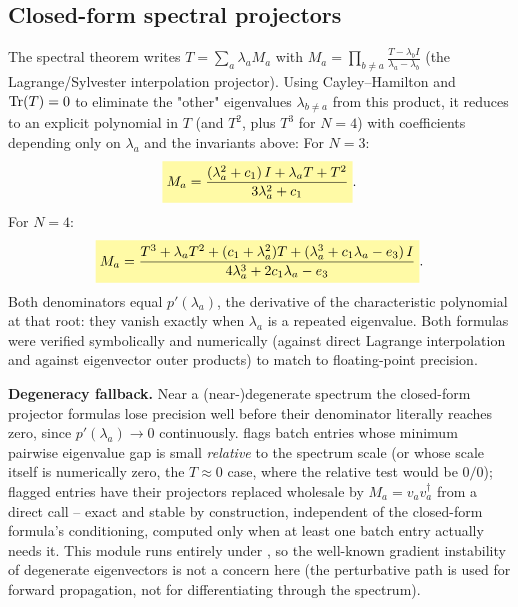 \begin{theorybox}
\subsection*{Closed-form spectral projectors}
The spectral theorem writes $T=\sum_a\lambda_a M_a$ with
$M_a=\prod_{b\neq a}\frac{T-\lambda_b I}{\lambda_a-\lambda_b}$ (the
Lagrange/Sylvester interpolation projector). Using Cayley--Hamilton and
$\Tr(T)=0$ to eliminate the "other" eigenvalues $\lambda_{b\neq a}$ from
this product, it reduces to an explicit polynomial in $T$ (and $T^2$, plus
$T^3$ for $N=4$) with coefficients depending only on $\lambda_a$ and the
invariants above:
For $N=3$:
\begin{equation}
  \keyresult{M_a = \frac{(\lambda_a^2+c_1)\,I + \lambda_a T + T^2}{3\lambda_a^2+c_1}}.
\end{equation}
For $N=4$:
\begin{equation}
  \keyresult{M_a = \frac{T^3+\lambda_a T^2+(c_1+\lambda_a^2)T+(\lambda_a^3+c_1\lambda_a-e_3)\,I}{4\lambda_a^3+2c_1\lambda_a-e_3}}.
\end{equation}
Both denominators equal $p'(\lambda_a)$, the derivative of the
characteristic polynomial at that root: they vanish exactly when
$\lambda_a$ is a repeated eigenvalue. Both formulas were verified
symbolically and numerically (against direct Lagrange interpolation and
against  eigenvector outer products) to match to
floating-point precision.
\end{theorybox}

\begin{notebox}
\textbf{Degeneracy fallback.} Near a (near-)degenerate spectrum the
closed-form projector formulas lose precision well before their
denominator literally reaches zero, since $p'(\lambda_a)\to0$
continuously.  flags batch entries
whose minimum pairwise eigenvalue gap is small \emph{relative} to the
spectrum scale (or whose scale itself is numerically zero, the $T\approx0$
case, where the relative test would be $0/0$); flagged entries have their
projectors replaced wholesale by $M_a=v_av_a^\dagger$ from a direct
 call -- exact and stable by construction,
independent of the closed-form formula's conditioning, computed only when
at least one batch entry actually needs it. This module runs entirely
under , so the well-known gradient instability of
degenerate eigenvectors is not a concern here (the perturbative path is
used for forward propagation, not for differentiating through the
spectrum).
\end{notebox}

